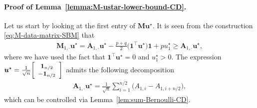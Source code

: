 \paragraph{Proof of Lemma~\ref{lemma:M-ustar-lower-bound-CD}.}

Let us start by looking at the first entry of $\bm{M}\bm{u}^{\star}$. 
It is seen from the construction \eqref{eq:M-data-matrix-SBM} that
%
\begin{align}
\bm{M}_{1,\cdot}\bm{u}^{\star}=\bm{A}_{1,\cdot}\bm{u}^{\star}-\frac{p+q}{2}\big(\bm{1}^{\top}\bm{u}^{\star}\big)\bm{1}+pu_{1}^{\star}
\geq \bm{A}_{1,\cdot}\bm{u}^{\star} ,
	\label{eq:connection-M1u-A1u-CD}
\end{align}
%
where we have used the fact that $\bm{1}^{\top}\bm{u}^{\star}=0$  and $u_1^{\star}>0$. 
The expression  $\bm{u}^{\star} =\frac{1}{\sqrt{n}}  {\small
\left[\begin{array}{c}
\bm{1}_{n/2}\\
-\bm{1}_{n/2}
\end{array}\right] }$ admits the following decomposition
%
\begin{align}
	\bm{A}_{1,\cdot}\bm{u}^{\star}
	= \frac{1}{\sqrt{n}}\sum\nolimits_{i=1}^{n/2}\big(A_{1,i}-A_{1,i+n/2}\big) , 
	\label{eq:A1ustar-decompose-CD}
\end{align}
%
which can be controlled via Lemma~\ref{lem:sum-Bernoulli-CD}. 



